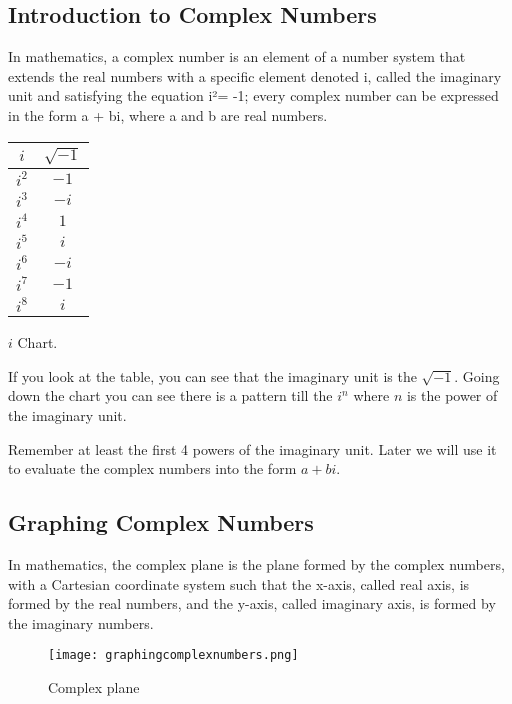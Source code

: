 \subsection{Introduction to Complex Numbers}
In mathematics, a complex number is an element of a number system that extends the real numbers
with a specific element denoted i, called the imaginary unit and satisfying the equation i²= -1; every
complex number can be expressed in the form a + bi, where a and b are real numbers.

\begin{center}
\begin{tabular}{|c|c|}    
    \hline	
    $i$ & $\sqrt{-1}$ \\ \hline
    $i^2$ & $-1$ \\ \hline
    $i^3$ & $-i$ \\ \hline
    $i^4$ & $1$ \\ \hline
    $i^5$ & $i$ \\ \hline
    $i^6$ & $-i$ \\ \hline
    $i^7$ & $-1$ \\ \hline
    $i^8$ & $i$ \\ \hline
\end{tabular}
\end{center}

\begin{center}
    $i$ Chart.
\end{center}

If you look at the table, you can see that the imaginary unit is the $\sqrt{-1}$. Going down the chart you can see there is a pattern till the $i^n$ where $n$ is the power of the imaginary unit.

Remember at least the first 4 powers of the imaginary unit. Later we will use it to evaluate the complex numbers into the form $a+bi$.

\subsection{Graphing Complex Numbers}
In mathematics, the complex plane is the plane formed by the complex numbers, with a Cartesian coordinate system such that the x-axis, called real axis, is formed by the real numbers, and the y-axis, called imaginary axis, is formed by the imaginary numbers. 


\begin{figure}[h!]
    \centering
    \texttt{[image: graphingcomplexnumbers.png]}
    \caption{Complex plane}    
\end{figure}

